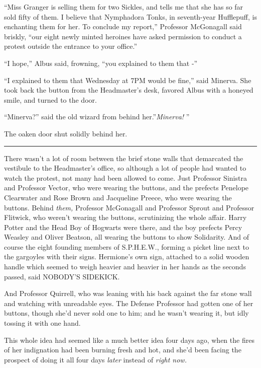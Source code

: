``Miss Granger is selling them for two Sickles, and tells me that she
has so far sold fifty of them. I believe that Nymphadora Tonks, in
seventh-year Hufflepuff, is enchanting them for her. To conclude my
report,'' Professor McGonagall said briskly, ``our eight newly minted
heroines have asked permission to conduct a protest outside the entrance
to your office.''

``I hope,'' Albus said, frowning, ``you explained to them that -''

``I explained to them that Wednesday at 7PM would be fine,'' said
Minerva. She took back the button from the Headmaster's desk, favored
Albus with a honeyed smile, and turned to the door.

``Minerva?'' said the old wizard from behind her.''\emph{Minerva!} ''

The oaken door shut solidly behind her.

\begin{center}\rule{3in}{0.4pt}\end{center}

There wasn't a lot of room between the brief stone walls that demarcated
the vestibule to the Headmaster's office, so although a lot of people
had wanted to watch the protest, not many had been allowed to come. Just
Professor Sinistra and Professor Vector, who were wearing the buttons,
and the prefects Penelope Clearwater and Rose Brown and Jacqueline
Preece, who were wearing the buttons. Behind \emph{them,} Professor
McGonagall and Professor Sprout and Professor Flitwick, who weren't
wearing the buttons, scrutinizing the whole affair. Harry Potter and the
Head Boy of Hogwarts were there, and the boy prefects Percy Weasley and
Oliver Beatson, all wearing the buttons to show Solidarity. And of
course the eight founding members of S.P.H.E.W., forming a picket line
next to the gargoyles with their signs. Hermione's own sign, attached to
a solid wooden handle which seemed to weigh heavier and heavier in her
hands as the seconds passed, said NOBODY'S SIDEKICK.

And Professor Quirrell, who was leaning with his back against the far
stone wall and watching with unreadable eyes. The Defense Professor had
gotten one of her buttons, though she'd never sold one to him; and he
wasn't wearing it, but idly tossing it with one hand.

This whole idea had seemed like a much better idea four days ago, when
the fires of her indignation had been burning fresh and hot, and she'd
been facing the prospect of doing it all four days \emph{later} instead
of \emph{right now.}


